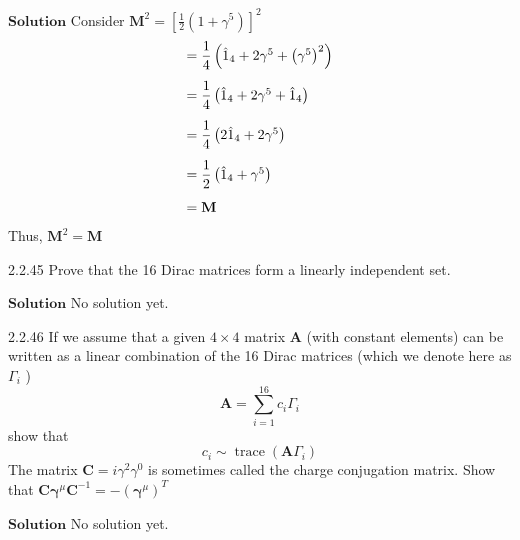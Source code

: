 \documentclass{article}
\begin{document}
\begin{flushleft}
$\boxed{\textbf{Solution}}$ Consider $\mathbf{M}^{2}=\left[\frac{1}{2}\left(1+\gamma^{5}\right)\right]^{2}$
$$
\begin{array}{l}
=\dfrac{1}{4}\left(\hat{1}_{4}+2 \gamma^{5}+\left(\gamma^{5}\right)^{2}\right)\vspace{3mm} \\
=\dfrac{1}{4}\left(\hat{1}_{4}+2 \gamma^{5}+\hat{1}_{4}\right) \vspace{3mm}\\
=\dfrac{1}{4}\left(2\hat{1}_{4}+2 \gamma^{5}\right) \vspace{3mm}\\
=\dfrac{1}{2}\left(\hat{1}_{4}+\gamma^{5}\right) \vspace{3mm}\\
=\mathbf{M}
\end{array}
$$
Thus, $\mathbf{M}^2 = \mathbf{M}$
 
\newpage


\begin{mybox}{2.2.45}
Prove that the 16 Dirac matrices form a linearly independent set.
\end{mybox}


$\boxed{\textbf{Solution}}$ No solution yet.

\newpage

\begin{mybox}{2.2.46}
If we assume that a given $4 \times 4$ matrix $\mathbf{A}$ (with constant elements) can be written as a linear combination of the 16 Dirac matrices (which we denote here as $\Gamma_{i}$ )
$$
\mathbf{A}=\sum_{i=1}^{16} c_{i} \Gamma_{i}
$$
show that
$$
c_{i} \sim \operatorname{trace}\left(\mathbf{A} \Gamma_{i}\right)
$$
The matrix $\mathbf{C}=i \gamma^{2} \gamma^{0}$ is sometimes called the charge conjugation matrix. Show that $\mathbf{C} \boldsymbol{\gamma}^{\mu} \mathbf{C}^{-1}=-\left(\boldsymbol{\gamma}^{\mu}\right)^{T}$
\end{mybox}

$\boxed{\textbf{Solution}}$ No solution yet.

\newpage


\end{flushleft}
\end{document}
